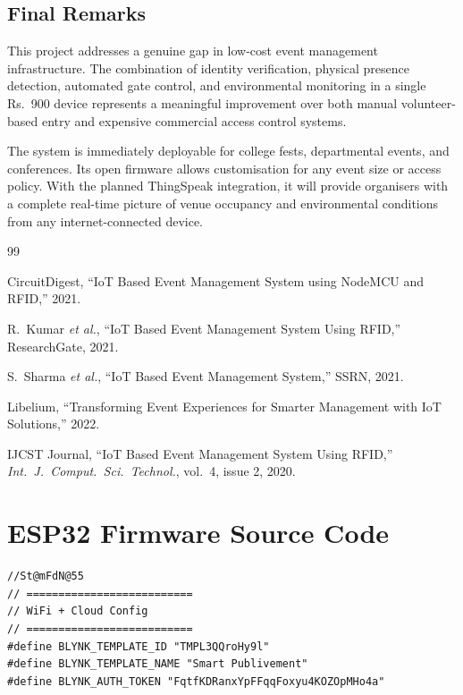 \documentclass[12pt,a4paper]{report}
\begin{document}
{\section{Final Remarks}

This project addresses a genuine gap in low-cost event management infrastructure. The combination of identity verification, physical presence detection, automated gate control, and environmental monitoring in a single Rs.~900 device represents a meaningful improvement over both manual volunteer-based entry and expensive commercial access control systems.

The system is immediately deployable for college fests, departmental events, and conferences. Its open firmware allows customisation for any event size or access policy. With the planned ThingSpeak integration, it will provide organisers with a complete real-time picture of venue occupancy and environmental conditions from any internet-connected device.

\begin{thebibliography}{99}

\setlength{\itemsep}{0.5em}

CircuitDigest,
``IoT Based Event Management System using NodeMCU and RFID,''
2021.

R.\ Kumar \textit{et al.},
``IoT Based Event Management System Using RFID,''
ResearchGate, 2021.

S.\ Sharma \textit{et al.},
``IoT Based Event Management System,''
SSRN, 2021.

Libelium,
``Transforming Event Experiences for Smarter Management with IoT Solutions,''
2022.

IJCST Journal,
``IoT Based Event Management System Using RFID,''
\textit{Int.\ J.\ Comput.\ Sci.\ Technol.}, vol.\ 4, issue 2, 2020.

\end{thebibliography}

\appendix

\chapter{ESP32 Firmware Source Code}
\begin{lstlisting}[caption={ESP32 Smart Event Management System -- Core Firmware}, label={lst:firmware}]
//St@mFdN@55
// ==========================
// WiFi + Cloud Config
// ==========================
#define BLYNK_TEMPLATE_ID "TMPL3QQroHy9l"
#define BLYNK_TEMPLATE_NAME "Smart Publivement"
#define BLYNK_AUTH_TOKEN "FqtfKDRanxYpFFqqFoxyu4KOZOpMHo4a"



\end{lstlisting}}
\end{document}
